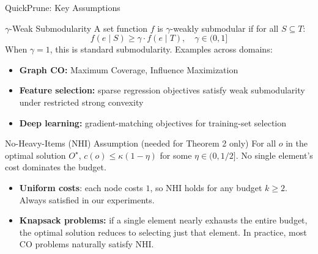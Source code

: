 \documentclass[aspectratio=169,xcolor=dvipsnames,8pt]{beamer}
\begin{document}
\begin{frame}{QuickPrune: Key Assumptions}
  \begin{block}{$\gamma$-Weak Submodularity}
    A set function $f$ is $\gamma$-weakly submodular if for all $S \subseteq T$:
    \[
      f(e \mid S) \geq \gamma \cdot f(e \mid T), \quad \gamma \in (0, 1]
    \]
    When $\gamma = 1$, this is standard submodularity. Examples across domains:
    \begin{itemize}
      \item \textbf{Graph CO:} Maximum Coverage, Influence Maximization~\cite{nemhauser1978analysis}
      \item \textbf{Feature selection:} sparse regression objectives satisfy weak submodularity under restricted strong convexity~\cite{elenberg2018restricted}
      \item \textbf{Deep learning:} gradient-matching objectives for training-set selection~\cite{killamsetty2023milo}
    \end{itemize}
  \end{block}

  \vspace{0.2cm}

  \begin{block}{No-Heavy-Items (NHI) Assumption \small(needed for Theorem 2 only)}
    For all $o$ in the optimal solution $O^\star$, $c(o) \le \kappa(1 - \eta)$
    for some $\eta \in (0, 1/2]$. No single element's cost dominates the budget.

    \vspace{0.15cm}

    \begin{itemize}
      \item \textbf{Uniform costs}: each node costs $1$,
        so NHI holds for any budget $k \ge 2$. Always satisfied in our experiments.
      \item \textbf{Knapsack problems:} if a single element nearly exhausts the
        entire budget, the optimal solution reduces to selecting just that element.
        In practice, most CO problems naturally satisfy NHI.
    \end{itemize}
  \end{block}
\end{frame}
\end{document}
